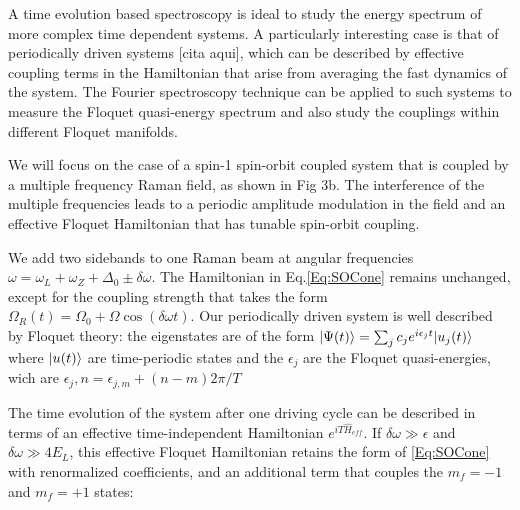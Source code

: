 A time evolution based spectroscopy is ideal to study the energy spectrum of more complex time dependent systems. A particularly interesting case is that of periodically driven systems [cita aqui], which can be described by effective coupling terms in the Hamiltonian that arise from averaging the fast dynamics of the system. The Fourier spectroscopy technique can be applied to such systems to measure the Floquet quasi-energy spectrum and also study the couplings within different Floquet manifolds. 

We will focus on the case of a spin-1 spin-orbit coupled system that is coupled by a multiple frequency Raman field, as shown in Fig 3b. The interference of the multiple frequencies leads to a periodic amplitude modulation in the field and an effective Floquet Hamiltonian that has tunable spin-orbit coupling. 

We add two sidebands to one Raman beam at angular frequencies $\omega=\omega_L+\omega_Z+\Delta_0 \pm \delta\omega$.  The Hamiltonian in Eq.\ref{Eq:SOCone} remains unchanged, except for the coupling strength that takes the form $	\Omega_R(t)=\Omega_0 + \Omega\cos(\delta\omega t)$. Our periodically driven system is well described by Floquet theory: the eigenstates are of the form $|\Psi(t)\rangle=\sum_{j}c_je^{i\epsilon_jt}|u_j(t)\rangle$ where $|u(t)\rangle$ are time-periodic states and the $\epsilon_j$ are the Floquet quasi-energies, wich are  $\epsilon_j,n=\epsilon_{j,m} + (n-m)2\pi/T$


The time evolution of the system after one driving cycle can be described in terms of an effective time-independent Hamiltonian $e^{iT\hat{H}_{eff}}$. If $\delta\omega \gg \epsilon$ and $\delta\omega \gg 4E_L$, this effective Floquet Hamiltonian retains the form of \ref{Eq:SOCone} with renormalized coefficients, and an additional term that couples the $m_f=-1$ and $m_f=+1$ states:

